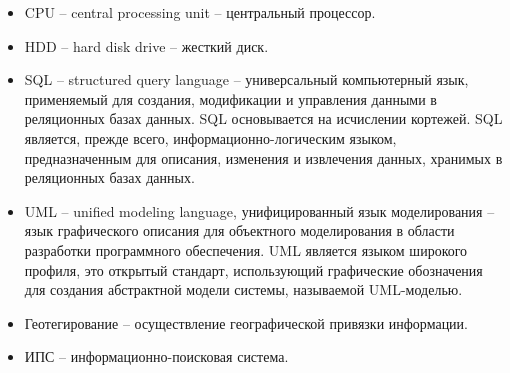 \begin{itemize}
\item CPU -- central processing unit -- центральный процессор.
\item HDD -- hard disk drive -- жесткий диск.
\item SQL -- structured query language -- универсальный компьютерный язык, применяемый для создания, модификации и управления данными в реляционных базах данных. SQL основывается на исчислении кортежей. SQL является, прежде всего, информационно-логическим языком, предназначенным для описания, изменения и извлечения данных, хранимых в реляционных базах данных. 
\item UML -- unified modeling language, унифицированный язык моделирования -- язык графического описания для объектного моделирования в области разработки программного обеспечения. UML является языком широкого профиля, это открытый стандарт, использующий графические обозначения для создания абстрактной модели системы, называемой UML-моделью.
\item Геотегирование -- осуществление географической привязки информации.
\item ИПС -- информационно-поисковая система.
\end{itemize}